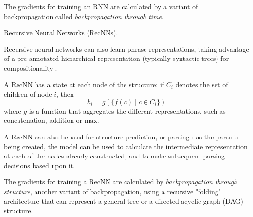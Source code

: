 \documentclass[11pt]{article}
\makeatletter
\renewcommand{\paragraph}{
  \@startsection{paragraph}{4}
  {\z@}{.3ex \@plus .3ex \@minus .2ex}{-1em}
  {\normalfont\normalsize\bfseries}
}
\makeatother
\begin{document}
The gradients for training an RNN are calculated by a variant of backpropagation
called \textit{backpropagation through time}.

\paragraph{Recursive Neural Networks (RecNNs).}

Recursive neural networks can also learn phrase representations, taking advantage
of a pre-annotated hierarchical representation (typically syntactic trees) for
compositionality \cite{socher2010learning}.

A RecNN has a state at each node of the structure: if $C_i$ denotes the set of children of
node $i$, then
\[
  h_i=g(\{f(c)\;|\;c\in C_i\})
\]
where $g$ is a function that aggregates the different representations, such as
concatenation, addition or $\mathrm{max}$.

A RecNN can also be used for structure prediction, or parsing
\cite{socher2013recursive,dyer2015transition}: as the parse is being created, the model can
be used to calculate the intermediate representation at each of the nodes already constructed,
and to make subsequent parsing decisions based upon it.

The gradients for training a RecNN are calculated by \textit{backpropagation
through structure}, another variant of backpropagation, using a recursive
"folding" architecture that can represent a general tree or a directed acyclic
graph (DAG) structure\cite{goller1996learning}.
\end{document}
